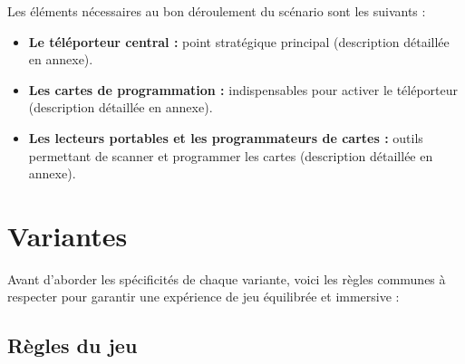 \documentclass{template}
\begin{document}
Les éléments nécessaires au bon déroulement du scénario sont les suivants :

\begin{itemize}
    \item \textbf{Le téléporteur central :} point stratégique principal (description détaillée en annexe).
    \item \textbf{Les cartes de programmation :} indispensables pour activer le téléporteur (description détaillée en annexe).
    \item \textbf{Les lecteurs portables et les programmateurs de cartes :} outils permettant de scanner et programmer les cartes (description détaillée en annexe).
\end{itemize}

\section{Variantes}

Avant d’aborder les spécificités de chaque variante, voici les règles communes à respecter pour garantir une expérience de jeu équilibrée et immersive :

\subsection*{Règles du jeu}
\end{document}
